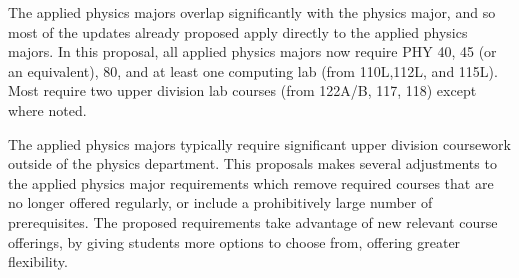 \documentclass[12pt]{article}
\begin{document}
The applied physics majors overlap significantly with the physics
major, and so most of the updates already proposed apply directly to
the applied physics majors.  In this proposal, all applied physics
majors now require PHY 40, 45 (or an equivalent), 80, and at least one
computing lab (from 110L,112L, and 115L).  Most require two upper
division lab courses (from 122A/B, 117, 118) except where noted.

The applied physics majors typically require significant upper
division coursework outside of the physics department.  This proposals
makes several adjustments to the applied physics major requirements
which remove required courses that are no longer offered regularly, or
include a prohibitively large number of prerequisites.  The proposed
requirements take advantage of new relevant course offerings, by
giving students more options to choose from, offering greater
flexibility.
\end{document}
